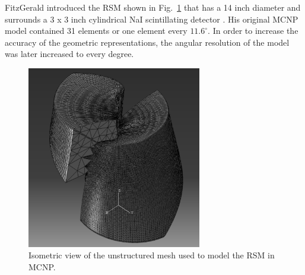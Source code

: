 \documentclass[3p,times]{elsarticle}
\begin{document}
FitzGerald introduced the RSM shown in Fig.~\ref{fig:RSM} that has a 14 inch diameter and surrounds a 3 x 3 inch cylindrical NaI scintillating detector \cite{FitzGerald2015}. 
His original MCNP model contained 31 elements or one element every $11.6^\circ$.  
In order to increase the accuracy of the geometric representations,  the angular resolution of the model was later increased to every degree.  

\begin{figure}[ht!]
\includegraphics[width={3.0in}]{../figs/P2AtIso.pdf}
\centering
\caption{Isometric view of the unstructured mesh used to model the RSM in MCNP.}
\label{fig:RSM}
\end{figure}
\end{document}
